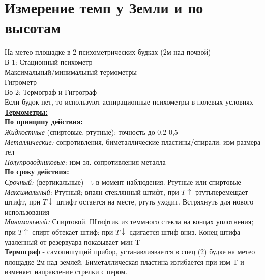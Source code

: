 
\section{Измерение темп у Земли и по высотам}
На метео площадке в 2 психометрических будках (2м над почвой)\\
В 1: Стационный психометр\\
Максимальный/минимальный термометры\\
Гигрометр\\
Во 2: Термограф и Гигрограф\\
Если будок нет, то используют аспирационные психометры в полевых условиях\\
\underline{\textbf{Термометры:}}\\
\textbf{По принципу действия:}\\
\textit{Жидкостные} (спиртовые, ртутные): точность до 0,2-0,5\\
\textit{Металлические:} сопротивления, биметаллические пластины/спирали: изм размера тел\\
\textit{Полупроводниковые:} изм эл. сопротивления металла\\

\textbf{По сроку действия:}\\
\textit{Срочный:} (вертикальные) - t в момент наблюдения. Ртутные или спиртовые\\
\textit{Максимальный:} Ртутный; впаян стеклянный штифт, при $T\uparrow$ ртутьперемещает штифт, при $T\downarrow$ штифт остается на месте, ртуть уходит. Встряхнуть для нового использования\\
\textit{Минимальный:} Спиртовой. Штифтик из теммного стекла на концах уплотнения; при $T\uparrow$ спирт обтекает штиф: при $T\downarrow$ сдигается штиф вниз. Конец штифа удаленный от резервуара показывает мин T\\

\textbf{Термограф} - самопишущий прибор, устанавлиявается в спец (2) будке на метео площадке 2м над землей. Биметаллическая пластина изгибается при изм T и изменяет направление стрелки с пером.
